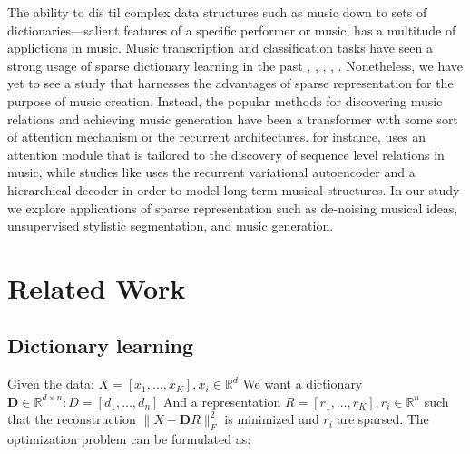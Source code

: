 \documentclass[11pt,a4paper]{article}
\begin{document}
The ability to dis til complex data structures such as music down to sets of dictionaries—salient features of a specific performer or music, has a multitude of applictions in music.  Music transcription and classification tasks have seen a strong usage of sparse dictionary learning in the past \cite{Grosse2007} \cite{Costantini2013}, \cite{Blumensath2006}, \cite{SrinivasM2014}, \cite{Srinivas2014}, \cite{Cogliati2016}. Nonetheless, we have yet to see a study that harnesses the advantages of sparse representation for the purpose of music creation. Instead, the popular methods for discovering music relations and achieving music generation have been a transformer with some sort of attention mechanism or the recurrent architectures. \cite{JiangJunyan2020} for instance, uses an attention module that is tailored to the discovery of sequence level relations in music, while studies like \cite{Roberts2018} uses the recurrent variational autoencoder and a hierarchical decoder in order to model long-term musical structures. In our study we explore applications of sparse representation such as de-noising musical ideas, unsupervised stylistic segmentation, and music generation.
 



\section{Related Work}


\subsection{ Dictionary learning  }
Given the data: $ X=\left[x_{1}, \ldots, x_{K}\right], x_{i} \in \mathbb{R}^{d} $ 
We want a dictionary $\mathbf{D} \in \mathbb{R}^{d \times n}: D=\left[d_{1}, \ldots, d_{n}\right]$ 
And a representation $R=\left[r_{1}, \ldots, r_{K}\right], r_{i} \in \mathbb{R}^{n}$ such that the reconstruction $\|X-\mathbf{D} R\|_{F}^{2}$ is minimized and $r_{i}$ are sparsed. The optimization problem can be formulated as: 
\end{document}
